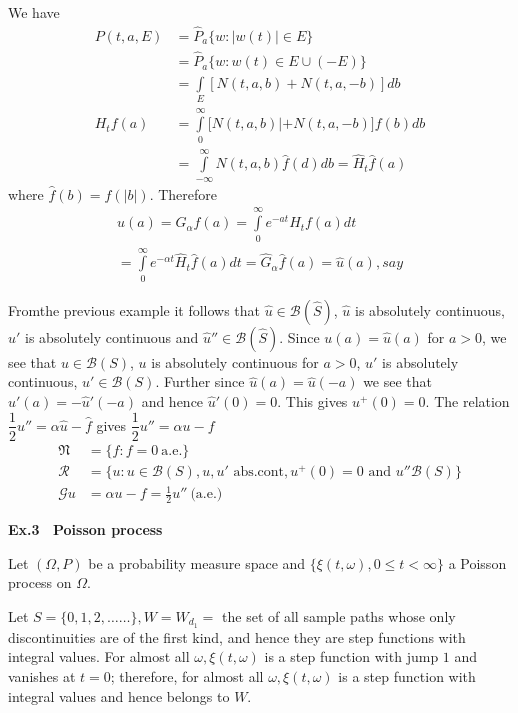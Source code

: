 We have 
\begin{align*}
  P(t, a, E) & = \hat{P}_a \{w : | w (t) | \in E \} \\
  & = \hat{P}_a \{ w :  w (t)\in E \cup (-E ) \} \\	
  & = \int\limits_E [ N (t, a, b)+ N(t, a, -b)]  db \\
  H_t f(a) & = \int\limits_0^\infty [ N (t, a, b)| + N(t, a, -b)\big ]
  f (b) db \\  
  & = \int\limits^\infty_{ - \infty} N(t, a, b) \hat{f} (d) db =
  \hat{H}_t \hat{f} (a)  
\end{align*}
where $\hat{f}(b) = f (|b|)$. Therefore 
\begin{multline*}
  u(a) = G_\alpha f(a) = \int\limits^\infty _ 0 e^{ - a t} H_t f (a) dt\\
  = \int\limits^{\infty}_0 e^{ - \alpha t } \hat{H}_t \hat{f}(a) dt =
  \hat{G}_\alpha \hat{f}(a) = \hat{u}(a) , say  
\end{multline*}

From\pageoriginale the previous example it follows that $\hat{u} \in
\mathscr{B}(\hat{S})$, $\hat{u}$ is absolutely continuous, $\hat{u}'$
is absolutely continuous and $\hat{u}''\in\mathscr{B}(\hat{S})$. 
Since $u(a) =\hat{u}(a)$ for $a > 0$, we see
that $u \in \mathscr{B}(S)$, $u$ is absolutely continuous for $a > 0$,
$u'$ is absolutely continuous, $u'\in\mathscr{B}(S)$.
Further since $\hat{u}(a)= \hat{u}(-a)$
we see that $\hat{u}' (a) = - \hat{u}' (-a)$ and hence $\hat{u}' (0) =
0$. This gives $u^+ (0) = 0$. The relation
$\dfrac{1}{2} \hat{u}'' = \alpha \hat{u} - \hat{f}$ gives
$\dfrac{1}{2}u'' = \alpha u - f$ 
\begin{align*}
 \mathfrak{N} &= \{ f : f = 0 ~\text{a.e.}\} \\
  \mathscr{R} & = \{ u : u \in \mathscr{B} (S), u, u'
  \text{\ abs.cont}, u^+ (0)=
  0 \text{\ and\ } u'' \mathscr{B} (S) \}\\ 
  \mathscr{G} u & = \alpha u - f = \frac{1}{2} u'' ~\text{(a.e.)}
\end{align*}

\medskip
\noindent
{\bf Ex.3~ Poisson process}
\smallskip

Let $(\Omega, P)$ be a probability measure space and $\{\xi (t,
\omega), 0 \leq t < \infty\}$ a Poisson process on $\Omega$.  

Let $S = \{ 0, 1, 2, \ldots\ldots \}, W = W_{d_1} = $ the set of all
sample paths whose only discontinuities are of the first kind, and
hence they are step functions with integral values. For almost all
$\omega , \xi (t, \omega)$ is a step function with jump $1$ and
vanishes at $t = 0$; therefore, for almost all $\omega , \xi (t, \omega)$
is a step function with integral values and hence belongs to $W$. 


